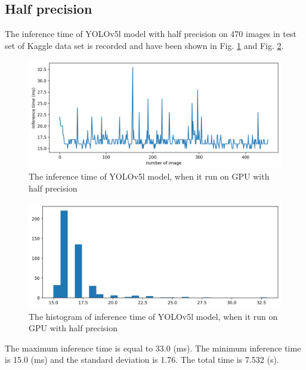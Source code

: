 \documentclass[12pt,a4paper]{article}
\begin{document}
\subsection*{Half precision}
The inference time of YOLOv5l model with half precision on 470 images in test set of Kaggle data set is recorded and have been shown in Fig. \ref{fig: gpulh} and Fig. \ref{fig: gpulh_hist}.
\begin{figure}[H]
    \centering
    \includegraphics[width=15cm]{figures/Inftime_yolov5L_half.png}
    \caption{The inference time of YOLOv5l model, when it run on GPU with half precision}
    \label{fig: gpulh}
\end{figure}
\begin{figure}[H]
    \centering
    \includegraphics[width=15cm]{figures/Inftime_yolov5L_half_hist.png}
    \caption{The histogram of inference time of YOLOv5l model, when it run on GPU with half precision}
    \label{fig: gpulh_hist}
\end{figure}
The maximum inference time is equal to 33.0 (ms). The minimum inference time is 15.0 (ms) and the standard deviation is 1.76. The total time is 7.532 (s).
\end{document}

